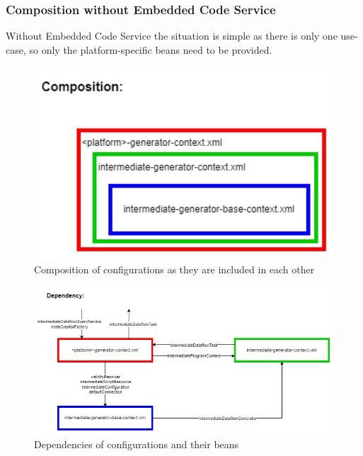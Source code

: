 \subsubsection{Composition without Embedded Code Service}
Without Embedded Code Service the situation is simple as there is only one use-case, so only the platform-specific beans need to be provided.
\begin{figure}[ht]\centering
\includegraphics[width=1.0\textwidth]{img/Intermediate Dataflow Generator Configuration-scanner-only composition.png}
\caption{Composition of configurations as they are included in each other}
\label{fig01:ECSbasedesign03}
\end{figure}   
\begin{figure}[ht]\centering
\includegraphics[width=1.0\textwidth]{img/Intermediate Dataflow Generator Configuration-scanner-only dependency.png}
\caption{Dependencies of configurations and their beans}
\label{fig01:ECSbasedesign04}
\end{figure}   

